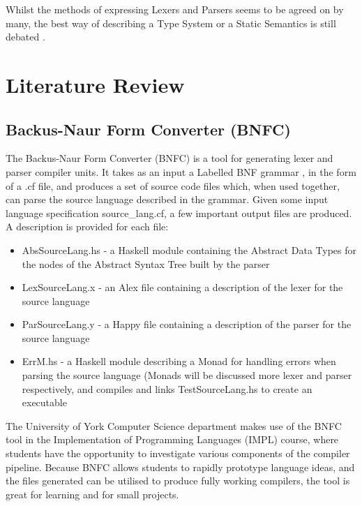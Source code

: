 \documentclass{UoYCSproject}
\begin{document}
Whilst the methods of expressing Lexers and Parsers seems to be agreed on by
many, the best way of describing a Type System or a Static Semantics is still
debated \cite{NeilJones}.

\chapter{Literature Review}

\section{Backus-Naur Form Converter (BNFC)}
\label{sec:BNFC}

The Backus-Naur Form Converter (BNFC) is a tool for generating lexer and parser
compiler units. It takes as an input a Labelled BNF grammar \cite{LBNFReport},
in the form of a {\ttfamily .cf} file, and produces a set of source code files
which, when used together, can parse the source language described in the
grammar. Given some input language specification {\ttfamily source\_lang.cf},
a few important output files are produced. A description is provided for each
file:
\begin{itemize}
    \item {\ttfamily AbsSourceLang.hs} - a Haskell module containing the Abstract
        Data Types for the nodes of the Abstract Syntax Tree built by the
        parser
    \item {\ttfamily LexSourceLang.x} - an Alex file containing a description
        of the lexer for the source language
    \item {\ttfamily ParSourceLang.y} - a Happy file containing a description
        of the parser for the source language
    \item {\ttfamily ErrM.hs} - a Haskell module describing a Monad for handling
        errors when parsing the source language (Monads will be discussed more
        lexer and parser respectively, and compiles and links TestSourceLang.hs
        to create an executable
\end{itemize}

The University of York Computer Science department makes use of the BNFC tool
in the Implementation of Programming Languages (IMPL) course, where students
have the opportunity to investigate various components of the compiler pipeline.
Because BNFC allows students to rapidly prototype language ideas, and the files
generated can be utilised to produce fully working compilers, the tool is great
for learning and for small projects.
\end{document}
